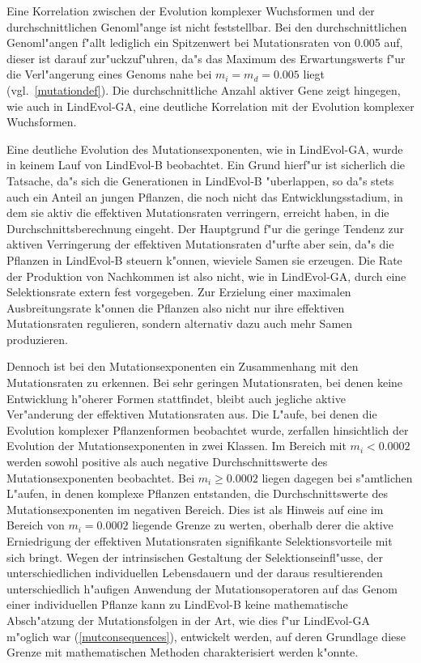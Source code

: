 Eine Korrelation zwischen der Evolution komplexer Wuchsformen und der durchschnittlichen Genoml"ange ist nicht feststellbar.
Bei den durchschnittlichen Genoml"angen f"allt lediglich ein Spitzenwert bei Mutationsraten von 0.005 auf, dieser ist
darauf zur"uckzuf"uhren, da"s das Maximum des Erwartungswerts f"ur die Verl"angerung eines Genoms nahe bei $m_i = m_d = 0.005$
liegt (vgl.\ \ref{mutationdef}). Die durchschnittliche Anzahl aktiver Gene zeigt hingegen, wie auch in LindEvol-GA,
eine deutliche Korrelation mit der Evolution komplexer Wuchsformen.

Eine deutliche Evolution des Mutationsexponenten, wie in LindEvol-GA, wurde in keinem Lauf von LindEvol-B beobachtet. Ein Grund
hierf"ur ist sicherlich die Tatsache, da"s sich die Generationen in LindEvol-B "uberlappen, so da"s stets auch ein Anteil an
jungen Pflanzen, die noch nicht das Entwicklungsstadium, in dem sie aktiv die effektiven Mutationsraten verringern, erreicht
haben, in die Durchschnittsberechnung eingeht. Der Hauptgrund f"ur die geringe Tendenz zur aktiven Verringerung der effektiven
Mutationsraten d"urfte aber sein, da"s die Pflanzen in LindEvol-B steuern k"onnen, wieviele Samen sie erzeugen. Die Rate der
Produktion von Nachkommen ist also nicht, wie in LindEvol-GA, durch eine Selektionsrate extern fest vorgegeben. Zur Erzielung
einer maximalen Ausbreitungsrate k"onnen die Pflanzen also nicht nur ihre effektiven Mutationsraten regulieren, sondern alternativ
dazu auch mehr Samen produzieren.

Dennoch ist bei den Mutationsexponenten ein Zusammenhang mit den Mutationsraten zu erkennen. Bei sehr geringen Mutationsraten,
bei denen keine Entwicklung h"oherer Formen stattfindet, bleibt auch jegliche aktive Ver"anderung der effektiven Mutationsraten
aus. Die L"aufe, bei denen die Evolution komplexer Pflanzenformen beobachtet wurde, zerfallen hinsichtlich der Evolution der
Mutationsexponenten in zwei Klassen. Im Bereich mit $m_i < 0.0002$ werden sowohl positive als auch negative Durchschnittswerte
des Mutationsexponenten beobachtet. Bei $m_i \geq 0.0002$ liegen dagegen bei s"amtlichen L"aufen, in denen komplexe Pflanzen
entstanden, die Durchschnittswerte des Mutationsexponenten im negativen Bereich. Dies ist als Hinweis auf eine im Bereich von
$m_i = 0.0002$ liegende Grenze zu werten, oberhalb derer die aktive Erniedrigung der effektiven Mutationsraten signifikante
Selektionsvorteile mit sich bringt. Wegen der intrinsischen Gestaltung der Selektionseinfl"usse, der unterschiedlichen individuellen
Lebensdauern und der daraus resultierenden unterschiedlich h"aufigen Anwendung der Mutationsoperatoren auf das Genom einer individuellen
Pflanze kann zu LindEvol-B keine mathematische Absch"atzung der Mutationsfolgen in der Art, wie dies f"ur LindEvol-GA m"oglich
war (\ref{mutconsequences}), entwickelt werden, auf deren Grundlage diese Grenze mit mathematischen Methoden charakterisiert werden
k"onnte.

